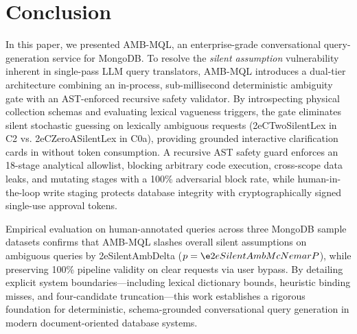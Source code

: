 \section{Conclusion}
\label{sec:conclusion}

In this paper, we presented AMB-MQL, an enterprise-grade conversational query-generation service for MongoDB. To resolve the \emph{silent assumption} vulnerability inherent in single-pass LLM query translators, AMB-MQL introduces a dual-tier architecture combining an in-process, sub-millisecond deterministic ambiguity gate with an AST-enforced recursive safety validator. By introspecting physical collection schemas and evaluating lexical vagueness triggers, the gate eliminates silent stochastic guessing on lexically ambiguous requests (\e2eCTwoSilentLex{} in C2 vs. \e2eCZeroASilentLex{} in C0a), providing grounded interactive clarification cards in \gateLatencyMean{} without token consumption. A recursive AST safety guard enforces an 18-stage analytical allowlist, blocking arbitrary code execution, cross-scope data leaks, and mutating stages with a 100\% adversarial block rate, while human-in-the-loop write staging protects database integrity with cryptographically signed single-use approval tokens.

Empirical evaluation on \numTotalQueries{} human-annotated queries across three MongoDB sample datasets confirms that AMB-MQL slashes overall silent assumptions on ambiguous queries by \e2eSilentAmbDelta{} ($p = \e2eSilentAmbMcNemarP{}$), while preserving 100\% pipeline validity on clear requests via user bypass. By detailing explicit system boundaries—including lexical dictionary bounds, heuristic binding misses, and four-candidate truncation—this work establishes a rigorous foundation for deterministic, schema-grounded conversational query generation in modern document-oriented database systems.
